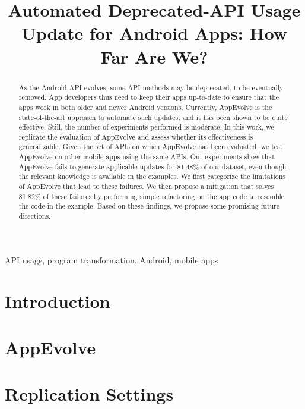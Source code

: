 \documentclass[conference]{IEEEtran}
\begin{document}
\def \toolname {AppEvolve}
\title{Automated Deprecated-API Usage Update for Android Apps: How Far Are We?}

\maketitle

\begin{abstract}
As the Android API evolves, some API methods may be deprecated, to be
eventually removed.  App developers thus need to keep their apps up-to-date
to ensure that the apps work in both older and newer Android versions.
Currently, AppEvolve is the state-of-the-art approach to automate such
updates, and it has been shown to be quite effective.  Still, the number of
experiments performed is moderate. In this work, we replicate the
evaluation of AppEvolve and assess whether its effectiveness is
generalizable. Given the set of APIs on which AppEvolve has been evaluated,
we test AppEvolve on other mobile apps using the same APIs. Our experiments
show that AppEvolve fails to generate applicable updates for 81.48\% of our
dataset, even though the relevant knowledge is available in the
examples. We first categorize the limitations of AppEvolve that lead to
these failures.  We then propose a mitigation that solves 81.82\% of these
failures by performing simple refactoring on the app code to resemble the
code in the example.  Based on these findings, we propose some promising
future directions.

\end{abstract}

\begin{IEEEkeywords}
API usage, program transformation, Android, mobile apps
\end{IEEEkeywords}

\section{Introduction}


\section{AppEvolve}\label{sec:approach}


\section{Replication Settings}\label{sec:replication}

\end{document}
